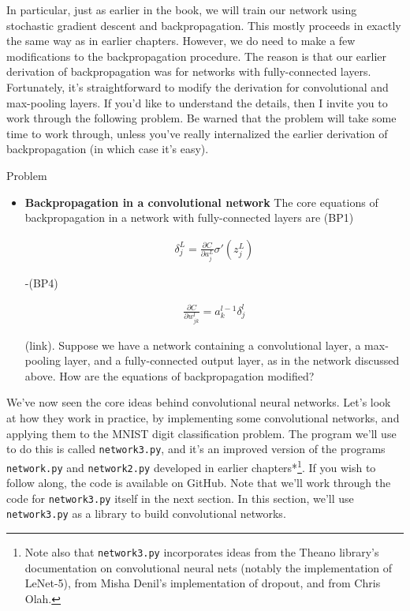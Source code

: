 In particular, just as earlier in the book, we will train our network using stochastic gradient descent and backpropagation. This mostly proceeds in exactly the same way as in earlier chapters. However, we do need to make a few modifications to the backpropagation procedure. The reason is that our earlier derivation of backpropagation was for networks with fully-connected layers. Fortunately, it's straightforward to modify the derivation for convolutional and max-pooling layers. If you'd like to understand the details, then I invite you to work through the following problem. Be warned that the problem will take some time to work through, unless you've really internalized the earlier derivation of backpropagation (in which case it's easy).



\begin{exerciseBox}{Problem}


\begin{itemize}

\item 
\textbf{Backpropagation in a convolutional network} The core equations of backpropagation in a network with fully-connected layers are (BP1)


\begin{align*}
\delta^L_j = \frac{\partial C}{\partial a^L_j} \sigma'(z^L_j) \nonumber
\end{align*}

-(BP4)


\begin{align*}
\frac{\partial C}{\partial w^l_{jk}} = a^{l-1}_k \delta^l_j \nonumber
\end{align*}

(link). Suppose we have a network containing a convolutional layer, a max-pooling layer, and a fully-connected output layer, as in the network discussed above. How are the equations of backpropagation modified?

\end{itemize}

\end{exerciseBox}





We've now seen the core ideas behind convolutional neural networks. Let's look at how they work in practice, by implementing some convolutional networks, and applying them to the MNIST digit classification problem. The program we'll use to do this is called \texttt{network3.py}, and it's an improved version of the programs \texttt{network.py} and \texttt{network2.py} developed in earlier chapters*\footnote{Note also that \texttt{network3.py} incorporates ideas from the Theano library's documentation on convolutional neural nets (notably the implementation of LeNet-5), from Misha Denil's implementation of dropout, and from Chris Olah.}. If you wish to follow along, the code is available on GitHub. Note that we'll work through the code for \texttt{network3.py} itself in the next section. In this section, we'll use \texttt{network3.py} as a library to build convolutional networks.


